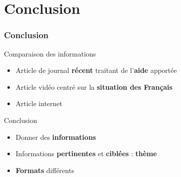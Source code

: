 \section{Conclusion}
\begin{frame}
\frametitle{Conclusion}
  \begin{block}{Comparaison des informations}
    \begin{itemize}
      \item{Article de journal \textbf{récent} traitant de l'\textbf{aide} apportée}
      \item{Article vidéo centré sur la \textbf{situation des Français}}
      \item{Article internet }
    \end{itemize} 
  \end{block} \pause
  
  \begin{block}{Conclusion}
    \begin{itemize}
      \item{Donner des \textbf{informations}}
      \item{Informations \textbf{pertinentes} et \textbf{ciblées} : \textbf{thème}}
      \item{\textbf{Formats} différents}
    \end{itemize}
  \end{block}
\end{frame}
